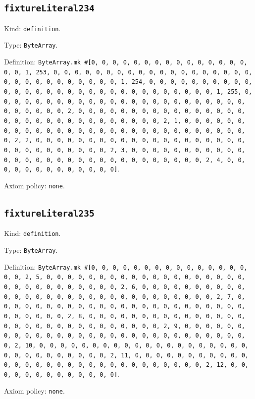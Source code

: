 \documentclass[11pt]{article}
\begin{document}
\subsection*{\texttt{fixtureLiteral234}}
\noindent Kind: \texttt{definition}.\par
\noindent Type: \texttt{ByteArray}.\par
\noindent Definition: \texttt{ByteArray.mk \#[0, 0, 0, 0, 0, 0, 0, 0, 0, 0, 0, 0, 0, 0, 0, 0, 0, 1, 253, 0, 0, 0, 0, 0, 0, 0, 0, 0, 0, 0, 0, 0, 0, 0, 0, 0, 0, 0, 0, 0, 0, 0, 0, 0, 0, 0, 0, 0, 0, 1, 254, 0, 0, 0, 0, 0, 0, 0, 0, 0, 0, 0, 0, 0, 0, 0, 0, 0, 0, 0, 0, 0, 0, 0, 0, 0, 0, 0, 0, 0, 0, 1, 255, 0, 0, 0, 0, 0, 0, 0, 0, 0, 0, 0, 0, 0, 0, 0, 0, 0, 0, 0, 0, 0, 0, 0, 0, 0, 0, 0, 0, 0, 0, 2, 0, 0, 0, 0, 0, 0, 0, 0, 0, 0, 0, 0, 0, 0, 0, 0, 0, 0, 0, 0, 0, 0, 0, 0, 0, 0, 0, 0, 0, 0, 0, 2, 1, 0, 0, 0, 0, 0, 0, 0, 0, 0, 0, 0, 0, 0, 0, 0, 0, 0, 0, 0, 0, 0, 0, 0, 0, 0, 0, 0, 0, 0, 0, 2, 2, 0, 0, 0, 0, 0, 0, 0, 0, 0, 0, 0, 0, 0, 0, 0, 0, 0, 0, 0, 0, 0, 0, 0, 0, 0, 0, 0, 0, 0, 0, 2, 3, 0, 0, 0, 0, 0, 0, 0, 0, 0, 0, 0, 0, 0, 0, 0, 0, 0, 0, 0, 0, 0, 0, 0, 0, 0, 0, 0, 0, 0, 0, 2, 4, 0, 0, 0, 0, 0, 0, 0, 0, 0, 0, 0, 0, 0]}.\par
\noindent Axiom policy: \texttt{none}.\par
\subsection*{\texttt{fixtureLiteral235}}
\noindent Kind: \texttt{definition}.\par
\noindent Type: \texttt{ByteArray}.\par
\noindent Definition: \texttt{ByteArray.mk \#[0, 0, 0, 0, 0, 0, 0, 0, 0, 0, 0, 0, 0, 0, 0, 0, 0, 2, 5, 0, 0, 0, 0, 0, 0, 0, 0, 0, 0, 0, 0, 0, 0, 0, 0, 0, 0, 0, 0, 0, 0, 0, 0, 0, 0, 0, 0, 0, 0, 2, 6, 0, 0, 0, 0, 0, 0, 0, 0, 0, 0, 0, 0, 0, 0, 0, 0, 0, 0, 0, 0, 0, 0, 0, 0, 0, 0, 0, 0, 0, 0, 2, 7, 0, 0, 0, 0, 0, 0, 0, 0, 0, 0, 0, 0, 0, 0, 0, 0, 0, 0, 0, 0, 0, 0, 0, 0, 0, 0, 0, 0, 0, 0, 2, 8, 0, 0, 0, 0, 0, 0, 0, 0, 0, 0, 0, 0, 0, 0, 0, 0, 0, 0, 0, 0, 0, 0, 0, 0, 0, 0, 0, 0, 0, 0, 2, 9, 0, 0, 0, 0, 0, 0, 0, 0, 0, 0, 0, 0, 0, 0, 0, 0, 0, 0, 0, 0, 0, 0, 0, 0, 0, 0, 0, 0, 0, 0, 2, 10, 0, 0, 0, 0, 0, 0, 0, 0, 0, 0, 0, 0, 0, 0, 0, 0, 0, 0, 0, 0, 0, 0, 0, 0, 0, 0, 0, 0, 0, 0, 2, 11, 0, 0, 0, 0, 0, 0, 0, 0, 0, 0, 0, 0, 0, 0, 0, 0, 0, 0, 0, 0, 0, 0, 0, 0, 0, 0, 0, 0, 0, 0, 2, 12, 0, 0, 0, 0, 0, 0, 0, 0, 0, 0, 0, 0, 0]}.\par
\noindent Axiom policy: \texttt{none}.\par
\end{document}
